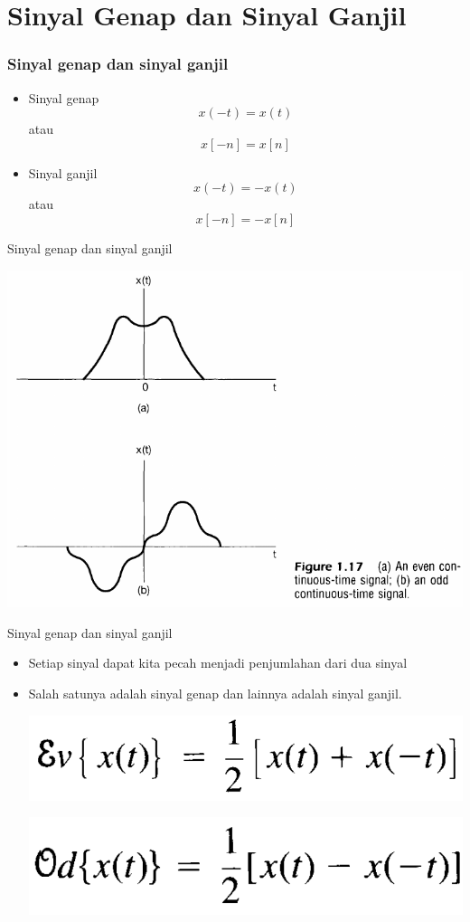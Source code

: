 \documentclass[pdflatex,compress,mathserif]{beamer}
\begin{document}
\section{Sinyal Genap dan Sinyal Ganjil}

\begin{frame}
	\frametitle{Sinyal genap dan sinyal ganjil}
	\begin{itemize}
		\item Sinyal genap
		$$ x(-t) = x(t) $$ atau $$ x[-n] = x[n] $$
		\item Sinyal ganjil
		$$ x(-t) = -x(t) $$ atau $$ x[-n] = -x[n] $$
	\end{itemize}
\end{frame}

\begin{frame}{Sinyal genap dan sinyal ganjil}
	\begin{center}
		\includegraphics[width=0.8\linewidth]{img/img28}
	\end{center}
\end{frame}

\begin{frame}{Sinyal genap dan sinyal ganjil}
	\begin{itemize}
		\item Setiap sinyal dapat kita pecah menjadi penjumlahan dari dua sinyal
		\item Salah satunya adalah sinyal genap dan lainnya adalah sinyal ganjil.
		\begin{center}
			\includegraphics[width=0.5\linewidth]{img/img31}
		\end{center}
		\begin{center}
			\includegraphics[width=0.5\linewidth]{img/img32}
		\end{center}
	\end{itemize}
\end{frame}
\end{document}
